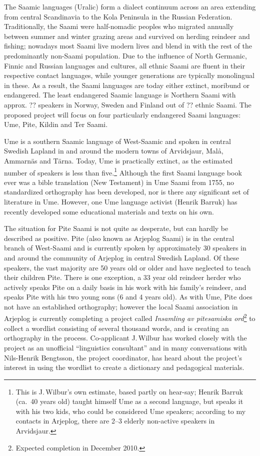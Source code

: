 \documentclass[a4paper,12pt]{article}
\begin{document}
The Saamic languages (Uralic) form a dialect continuum across an area extending from central Scandinavia to the Kola Peninsula in the Russian Federation. Traditionally, the Saami were half-nomadic peoples who migrated annually between summer and winter grazing areas and survived on herding reindeer and fishing; nowadays most Saami live modern lives and blend in with the rest of the predominantly non-Saami population. Due to the influence of North Germanic, Finnic and Russian languages and cultures, all ethnic Saami are fluent in their respective contact languages, while younger generations are typically monolingual in these. As a result, the Saami languages are today either extinct, moribund or endangered. The least endangered Saamic language is Northern Saami with approx. ?? speakers in Norway, Sweden and Finland out of ?? ethnic Saami.%
The proposed project will focus on four particularly endangered Saami languages: Ume, Pite, Kildin and Ter Saami.

Ume is a southern Saamic language of West-Saamic and spoken in central Swedish Lapland in and around the modern towns of Arvidsjaur, Malå, Ammarnäs and Tärna. Today, Ume is practically extinct, as the estimated number of speakers is less than five.\footnote{This is J.\,Wilbur's own estimate, based partly on hear-say; Henrik Barruk (ca.~40 years old) taught himself Ume as a second language, but speaks it with his two kids, who could be considered Ume speakers; according to my contacts in Arjeplog, there are 2–3 elderly non-active speakers in Arvidsjaur.} Although the first Saami language book ever was a bible translation (New Testament) in Ume Saami from 1755, no standardized orthography has been developed, nor is there any significant set of literature in Ume. However, one Ume language activist (Henrik Barruk) has recently developed some educational materials and texts on his own.

The situation for Pite Saami is not quite as desperate, but can hardly be described as positive. Pite (also known as Arjeplog Saami) is in the central branch of West-Saami and is currently spoken by approximately 30 speakers in and around the community of Arjeplog in central Swedish Lapland. Of these speakers, the vast majority are 50 years old or older and have neglected to teach their children Pite. There is one exception, a 33 year old reindeer herder who actively speaks Pite on a daily basis in his work with his family's reindeer, and speaks Pite with his two young sons (6 and 4 years old). As with Ume, Pite does not have an established orthography; however the local Saami association in Arjeplog is currently completing a project called \textit{Insamling av pitesamiska ord}\footnote{Expected completion in December 2010.} to collect a wordlist consisting of several thousand words, and is creating an orthography in the process. Co-applicant J.\,Wilbur has worked closely with the project as an unofficial “linguistics consultant” and in many conversations with Nils-Henrik Bengtsson, the project coordinator, has heard about the project's interest in using the wordlist to create a dictionary and pedagogical materials.
\end{document}
